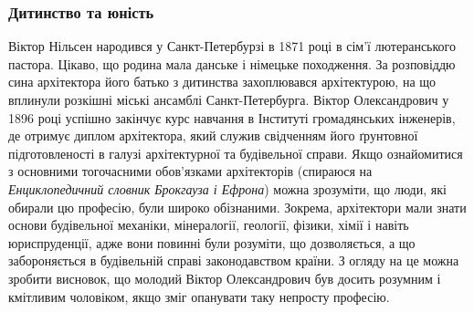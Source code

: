  
 
 
 
 

\subsubsection{Дитинство та юність}

Віктор Нільсен народився у Санкт-Петербурзі в 1871 році в сім'ї лютеранського
пастора. Цікаво, що родина мала данське і німецьке походження. За розповіддю
сина архітектора його батько з дитинства захоплювався архітектурою, на що
вплинули розкішні міські ансамблі Санкт-Петербурга. Віктор Олександрович у 1896
році успішно закінчує курс навчання в Інституті громадянських інженерів, де
отримує диплом архітектора, який служив свідченням його ґрунтовної
підготовленості в галузі архітектурної та будівельної справи. Якщо ознайомитися
з основними тогочасними обов'язками архітекторів (спираюся на \emph{Енциклопедичний
словник Брокгауза і Ефрона}) можна зрозуміти, що люди, які обирали цю професію,
були широко обізнаними. Зокрема, архітектори мали знати основи будівельної
механіки, мінералогії, геології, фізики, хімії і навіть юриспруденції, адже
вони повинні були розуміти, що дозволяється, а що забороняється в будівельній
справі законодавством країни. З огляду на це можна зробити висновок, що молодий
Віктор Олександрович був досить розумним і кмітливим чоловіком, якщо зміг
опанувати таку непросту професію.
